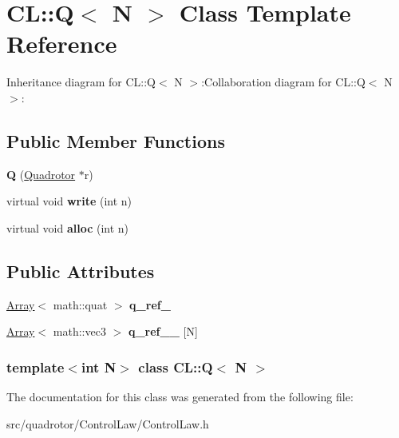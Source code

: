 \hypertarget{classCL_1_1Q}{
\section{CL::Q$<$ N $>$ Class Template Reference}
\label{classCL_1_1Q}
}
Inheritance diagram for CL::Q$<$ N $>$:Collaboration diagram for CL::Q$<$ N $>$:\subsection*{Public Member Functions}
\begin{DoxyCompactItemize}
\item 
\hypertarget{classCL_1_1Q_a557703c167bbb4032c6f5a3776ddd126}{
{\bfseries Q} (\hyperlink{classQuadrotor}{Quadrotor} $\ast$r)}
\label{classCL_1_1Q_a557703c167bbb4032c6f5a3776ddd126}

\item 
\hypertarget{classCL_1_1Q_a42ada1340b7ea8c18d4466b765a81c1f}{
virtual void {\bfseries write} (int n)}
\label{classCL_1_1Q_a42ada1340b7ea8c18d4466b765a81c1f}

\item 
\hypertarget{classCL_1_1Q_aaeb1c2b8db39ba2673f60027cf034cc8}{
virtual void {\bfseries alloc} (int n)}
\label{classCL_1_1Q_aaeb1c2b8db39ba2673f60027cf034cc8}

\end{DoxyCompactItemize}
\subsection*{Public Attributes}
\begin{DoxyCompactItemize}
\item 
\hypertarget{classCL_1_1Q_a1280b14c80c8b20c412a238eedb2ff6c}{
\hyperlink{classArray}{Array}$<$ math::quat $>$ {\bfseries q\_\-ref\_\-}}
\label{classCL_1_1Q_a1280b14c80c8b20c412a238eedb2ff6c}

\item 
\hypertarget{classCL_1_1Q_af7862277ebb36e485ca19c4bb3e8bdcd}{
\hyperlink{classArray}{Array}$<$ math::vec3 $>$ {\bfseries q\_\-ref\_\-\_\-} \mbox{[}N\mbox{]}}
\label{classCL_1_1Q_af7862277ebb36e485ca19c4bb3e8bdcd}

\end{DoxyCompactItemize}
\subsubsection*{template$<$int N$>$ class CL::Q$<$ N $>$}



The documentation for this class was generated from the following file:\begin{DoxyCompactItemize}
\item 
src/quadrotor/ControlLaw/ControlLaw.h\end{DoxyCompactItemize}
